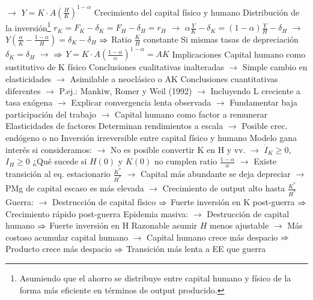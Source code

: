 \documentclass{nuevotema}
\begin{document}
\begin{esquemal}
				\4[] $\to$ $Y = K \cdot A \left( \frac{H}{K} \right)^{1-\alpha}$
				\4 Crecimiento del capital físico y humano
				\4[] 
				\4 Distribución de la inversión\footnote{Asumiendo que el ahorro se distribuye entre capital humano y físico de la forma más eficiente en términos de output producido.}
				\4[] $r_K = F_K - \delta_K = F_H - \delta_H = r_H$
				\4[] $\to$ $\alpha \frac{Y}{K} - \delta_K = (1-\alpha) \frac{Y}{H} - \delta_H$
				\4[] $\to$ $Y \left(  \frac{\alpha}{K} - \frac{1-\alpha}{H} \right) = \delta_K - \delta_H$
				\4[] $\Rightarrow$ Ratio $\frac{K}{H}$ constante
				\4[] Si mismas tasas de depreciación $\delta_K = \delta_H$
				\4[] $\to$ 
				\4[] $\Rightarrow$ $Y = K \cdot A \left( \frac{1-\alpha}{\alpha} \right)^{1-\alpha} = A K$
			\3 Implicaciones
				\4 Capital humano como sustitutivo de K físico
				\4[] Conclusiones cualitativas inalteradas
				\4[] $\to$ Simple cambio en elasticidades
				\4[] $\to$ Asimilable a neoclásico o AK
				\4[] Conclusiones cuantitativas diferentes
				\4[] $\to$ P.ej.: Mankiw, Romer y Weil (1992)
				\4[] $\to$ Incluyendo L creciente a tasa exógena
				\4[] $\to$ Explicar convergencia lenta observada
				\4[] $\to$ Fundamentar baja participación del trabajo
				\4[] $\to$ Capital humano como factor a remunerar
				\4 Elasticidades de factores
				\4[] Determinan rendimientos a escala
				\4[] $\to$ Posible crec. endógeno o no
				\4 Inversión irreversible entre capital físico y humano
				\4[] Modelo gana interés si consideramos:
				\4[] $\to$ No es posible convertir K en H y vv.
				\4[] $\to$ $\dot{I}_K \geq 0$, $\dot{I}_H \geq 0$
				\4[] ¿Qué sucede si $H(0)$ y $K(0)$ no cumplen ratio $\frac{1-\alpha}{\alpha}$
				\4[] $\to$ Existe transición al eq. estacionario $\frac{K^*}{H^*}$
				\4[] $\to$ Capital más abundante se deja depreciar
				\4[] $\to$ PMg de capital escaso es más elevada
				\4[] $\to$ Crecimiento de output alto hasta $\frac{K^*}{H^*}$
				\4[] 
				\4[] Guerra:
				\4[] $\to$ Destrucción de capital físico
				\4[] $\Rightarrow$ Fuerte inversión en K post-guerra
				\4[] $\Rightarrow$ Crecimiento rápido post-guerra
				\4[] Epidemia masiva:
				\4[] $\to$ Destrucción de capital humano
				\4[] $\Rightarrow$ Fuerte inversión en H
				\4[] Razonable asumir $H$ menos ajustable
				\4[] $\to$ Más costoso acumular capital humano
				\4[] $\to$ Capital humano crece más despacio
				\4[] $\Rightarrow$ Producto crece más despacio
				\4[] $\Rightarrow$ Transición más lenta a EE que guerra

\end{esquemal}
\end{document}
